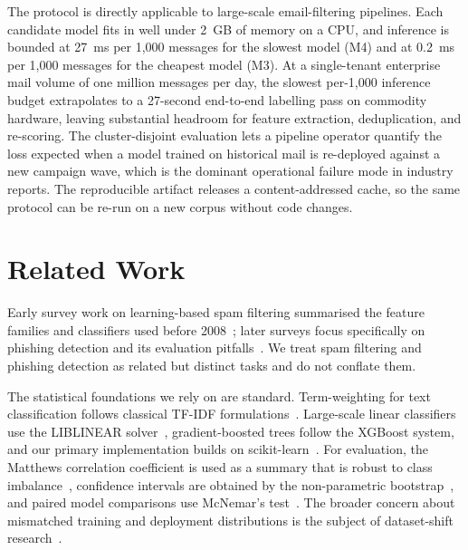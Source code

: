 \documentclass[conference]{IEEEtran}
\begin{document}
The protocol is directly applicable to large-scale email-filtering pipelines. Each candidate model fits in well under 2~GB of memory on a CPU, and inference is bounded at 27~ms per 1{,}000 messages for the slowest model (M4) and at 0.2~ms per 1{,}000 messages for the cheapest model (M3). At a single-tenant enterprise mail volume of one million messages per day, the slowest per-1{,}000 inference budget extrapolates to a 27-second end-to-end labelling pass on commodity hardware, leaving substantial headroom for feature extraction, deduplication, and re-scoring. The cluster-disjoint evaluation lets a pipeline operator quantify the loss expected when a model trained on historical mail is re-deployed against a new campaign wave, which is the dominant operational failure mode in industry reports. The reproducible artifact releases a content-addressed cache, so the same protocol can be re-run on a new corpus without code changes.

\section{Related Work}
Early survey work on learning-based spam filtering summarised the feature families and classifiers used before 2008~\cite{blanzieri_bryl}; later surveys focus specifically on phishing detection and its evaluation pitfalls~\cite{gupta_phishing}. We treat spam filtering and phishing detection as related but distinct tasks and do not conflate them.

The statistical foundations we rely on are standard. Term-weighting for text classification follows classical TF-IDF formulations~\cite{salton_buckley}. Large-scale linear classifiers use the LIBLINEAR solver~\cite{liblinear}, gradient-boosted trees follow the XGBoost system, and our primary implementation builds on scikit-learn~\cite{sklearn}. For evaluation, the Matthews correlation coefficient is used as a summary that is robust to class imbalance~\cite{matthews}, confidence intervals are obtained by the non-parametric bootstrap~\cite{efron_tibshirani}, and paired model comparisons use McNemar's test~\cite{mcnemar}. The broader concern about mismatched training and deployment distributions is the subject of dataset-shift research~\cite{dataset_shift}.
\end{document}
